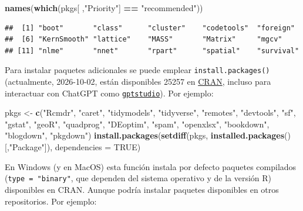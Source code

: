 \documentclass[
]{book}
\newenvironment{Shaded}{\begin{snugshade}}{\end{snugshade}}
\newcommand{\AttributeTok}[1]{\textcolor[rgb]{0.13,0.29,0.53}{#1}}
\newcommand{\ConstantTok}[1]{\textcolor[rgb]{0.56,0.35,0.01}{#1}}
\newcommand{\FunctionTok}[1]{\textcolor[rgb]{0.13,0.29,0.53}{\textbf{#1}}}
\newcommand{\NormalTok}[1]{#1}
\newcommand{\OtherTok}[1]{\textcolor[rgb]{0.56,0.35,0.01}{#1}}
\newcommand{\SpecialCharTok}[1]{\textcolor[rgb]{0.81,0.36,0.00}{\textbf{#1}}}
\newcommand{\StringTok}[1]{\textcolor[rgb]{0.31,0.60,0.02}{#1}}
\theoremstyle{break}
\theoremstyle{nonumberplain}
\begin{document}
\begin{Shaded}
\begin{Highlighting}[]
\FunctionTok{names}\NormalTok{(}\FunctionTok{which}\NormalTok{(pkgs[ ,}\StringTok{"Priority"}\NormalTok{] }\SpecialCharTok{==} \StringTok{"recommended"}\NormalTok{))}
\end{Highlighting}
\end{Shaded}

\begin{verbatim}
##  [1] "boot"       "class"      "cluster"    "codetools"  "foreign"   
##  [6] "KernSmooth" "lattice"    "MASS"       "Matrix"     "mgcv"      
## [11] "nlme"       "nnet"       "rpart"      "spatial"    "survival"
\end{verbatim}

Para instalar paquetes adicionales se puede emplear \texttt{install.packages()} (actualmente, 2026-10-02, están disponibles 25257 en \href{https://cran.r-project.org/web/packages/available_packages_by_date.html}{CRAN}, incluso para interactuar con ChatGPT como \href{https://michelnivard.github.io/gptstudio}{\texttt{gptstudio}}).
Por ejemplo:

\begin{Shaded}
\begin{Highlighting}[]
\NormalTok{pkgs }\OtherTok{\textless{}{-}} \FunctionTok{c}\NormalTok{(}\StringTok{"Rcmdr"}\NormalTok{, }\StringTok{"caret"}\NormalTok{, }\StringTok{"tidymodels"}\NormalTok{, }\StringTok{"tidyverse"}\NormalTok{, }\StringTok{"remotes"}\NormalTok{, }\StringTok{"devtools"}\NormalTok{,}
          \StringTok{"sf"}\NormalTok{, }\StringTok{"gstat"}\NormalTok{, }\StringTok{"geoR"}\NormalTok{, }\StringTok{"quadprog"}\NormalTok{, }\StringTok{"DEoptim"}\NormalTok{, }\StringTok{"spam"}\NormalTok{, }\StringTok{"openxlsx"}\NormalTok{,}
            \StringTok{"bookdown"}\NormalTok{, }\StringTok{"blogdown"}\NormalTok{, }\StringTok{"pkgdown"}\NormalTok{)}
\FunctionTok{install.packages}\NormalTok{(}\FunctionTok{setdiff}\NormalTok{(pkgs, }\FunctionTok{installed.packages}\NormalTok{()[,}\StringTok{"Package"}\NormalTok{]), }\AttributeTok{dependencies =} \ConstantTok{TRUE}\NormalTok{)}
\end{Highlighting}
\end{Shaded}

En Windows (y en MacOS) esta función instala por defecto paquetes compilados (\texttt{type\ =\ "binary"}, que dependen del sistema operativo y de la versión R) disponibles en CRAN.
Aunque podría instalar paquetes disponibles en otros repositorios.
Por ejemplo:
\end{document}

